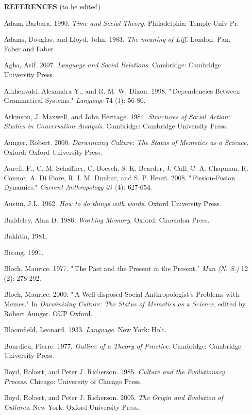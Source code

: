 

\textbf{REFERENCES} (to be edited)





Adam, Barbara. 1990. \textit{Time and Social Theory}. Philadelphia: 
Temple Univ Pr.

Adams, Douglas, and Lloyd, John. 1983. \textit{The meaning of Liff}. 
London: Pan, Faber and Faber.

Agha, Asif. 2007. \textit{Language and Social Relations}. Cambridge: 
Cambridge University Press.

Aikhenvald, Alexandra Y., and R. M. W. Dixon. 1998. "\,Dependencies 
Between Grammatical Systems." \textit{Language} 74 (1): 56-80.

Atkinson, J. Maxwell, and John Heritage. 1984. \textit{Structures of 
Social Action: Studies in Conversation Analysis}. Cambridge: Cambridge 
University Press.

Aunger, Robert. 2000. \textit{Darwinizing Culture: The Status of 
Memetics as a Science}. Oxford: Oxford University Press.

Aureli, F., C. M. Schaffner, C. Boesch, S. K. Bearder, J. Call, C. A. 
Chapman, R. Connor, A. Di Fiore, R. I. M. Dunbar, and S. P. Henzi. 2008. 
"\,Fission-Fusion Dynamics." \textit{Current Anthropology} 49 (4): 
627-654.

Austin, J.L. 1962. \textit{How to do things with words}. Oxford 
University Press.

Baddeley, Alan D. 1986. \textit{Working Memory}. Oxford: Clarendon 
Press.

Bakhtin, 1981.

Bisang, 1991.

Bloch, Maurice. 1977. "\,The Past and the Present in the Present." 
\textit{Man (N. S.)} 12 (2): 278-292.

Bloch, Maurice. 2000. "\,A Well-disposed Social Anthropologist's 
Problems with Memes." In \textit{Darwinizing Culture: The Status of 
Memetics as a Science}, edited by Robert Aunger. OUP Oxford.

Bloomfield, Leonard. 1933. \textit{Language}. New York: Holt.

Bourdieu, Pierre. 1977. \textit{Outline of a Theory of Practice}. 
Cambridge: Cambridge University Press.

Boyd, Robert, and Peter J. Richerson. 1985. \textit{Culture and the 
Evolutionary Process}. Chicago: University of Chicago Press.

Boyd, Robert, and Peter J. Richerson. 2005. \textit{The Origin and 
Evolution of Cultures}. New York: Oxford University Press.

